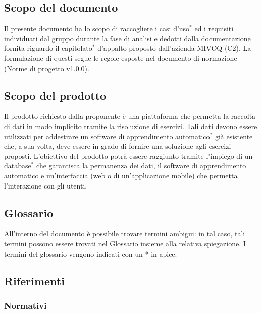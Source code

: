 \subsection{Scopo del documento}
	Il presente documento ha lo scopo di raccogliere i casi d'uso$^*$ ed i requisiti individuati dal gruppo durante la fase di analisi e dedotti dalla documentazione fornita riguardo il capitolato$^*$ d'appalto proposto dall'azienda MIVOQ (C2). La formulazione di questi segue le regole esposte nel documento di normazione (Norme di progetto v1.0.0).

\subsection{Scopo del prodotto}
	Il prodotto richiesto dalla proponente è una piattaforma che permetta la raccolta di dati in modo implicito tramite la risoluzione di esercizi. Tali dati devono essere utilizzati per addestrare un software di apprendimento automatico$^*$ già esistente che, a sua volta, deve essere in grado di fornire una soluzione agli esercizi proposti. L'obiettivo del prodotto potrà essere raggiunto tramite l'impiego di un database$^*$ che garantisca la permanenza dei dati, il software di apprendimento automatico e un'interfaccia (web o di un'applicazione mobile) che permetta l'interazione con gli utenti.

\subsection{Glossario}
	All'interno del documento è possibile trovare termini ambigui: in tal caso, tali termini possono essere trovati nel Glossario insieme alla relativa spiegazione. I termini del glossario vengono indicati con un * in apice.
	
\subsection{Riferimenti}
	\subsubsection{Normativi}
